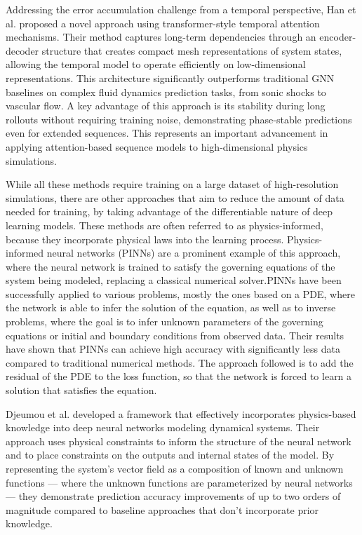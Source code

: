 Addressing the error accumulation challenge from a temporal perspective, Han et al. \cite{hanPredictingPhysicsMeshreduced2022a} proposed a novel approach using transformer-style temporal attention mechanisms. Their method captures long-term dependencies through an encoder-decoder structure that creates compact mesh representations of system states, allowing the temporal model to operate efficiently on low-dimensional representations. This architecture significantly outperforms traditional GNN baselines on complex fluid dynamics prediction tasks, from sonic shocks to vascular flow. A key advantage of this approach is its stability during long rollouts without requiring training noise, demonstrating phase-stable predictions even for extended sequences. This represents an important advancement in applying attention-based sequence models to high-dimensional physics simulations.

While all these methods require training on a large dataset of high-resolution simulations, there are other approaches that aim to reduce the amount of data needed for training, by taking advantage of the differentiable nature of deep learning models. These methods are often referred to as physics-informed, because they incorporate physical laws into the learning process. Physics-informed neural networks (PINNs) \cite{raissi2024physicsinformedneuralnetworksextensions} are a prominent example of this approach, where the neural network is trained to satisfy the governing equations of the system being modeled, replacing a classical numerical solver.PINNs have been successfully applied to various problems, mostly the ones based on a PDE, where the network is able to infer the solution of the equation, as well as to inverse problems, where the goal is to infer unknown parameters of the governing equations or initial and boundary conditions from observed data. Their results have shown that PINNs can achieve high accuracy with significantly less data compared to traditional numerical methods. The approach followed is to add the residual of the PDE to the loss function, so that the network is forced to learn a solution that satisfies the equation.

Djeumou et al. \cite{djeumouNeuralNetworksPhysicsInformed2022} developed a framework that effectively incorporates physics-based knowledge into deep neural networks modeling dynamical systems. Their approach uses physical constraints to inform the structure of the neural network and to place constraints on the outputs and internal states of the model. By representing the system's vector field as a composition of known and unknown functions — where the unknown functions are parameterized by neural networks — they demonstrate prediction accuracy improvements of up to two orders of magnitude compared to baseline approaches that don't incorporate prior knowledge.

